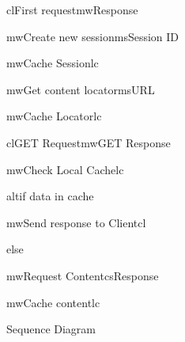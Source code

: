 \begin{figure}[h]
\begin{center}

	\resizebox{1.0\textwidth}{0.8\textwidth} {

	\begin{sequencediagram}

	\begin{call}{cl}{First request}{mw}{Response}

		\begin{call}{mw}{Create new session}{ms}{Session ID}
		\end{call}

		\begin{call}{mw}{Cache Session}{lc}{}
		\end{call}

		\begin{call}{mw}{Get content locator}{ms}{URL}
		\end{call}

		\begin{call}{mw}{Cache Locator}{lc}{}
		\end{call}

	\end{call}

	\begin{call}{cl}{GET Request}{mw}{GET Response}
		
		\begin{call}{mw}{Check Local Cache}{lc}{}
		\end{call}

		\begin{sdblock}{alt}{if data in cache}
			\begin{call}{mw}{Send response to Client}{cl}{}
			\end{call}
			\begin{sdblock}{else}{}
				\begin{call}{mw}{Request Content}{cs}{Response}
				\end{call}
				\begin{call}{mw}{Cache content}{lc}{}
				\end{call}
			\end{sdblock}
		\end{sdblock}


	\end{call}

	\end{sequencediagram}
	}

\end{center}
\caption{Sequence Diagram}
\label{fig:arch_uml}
\end{figure}

\newpage
